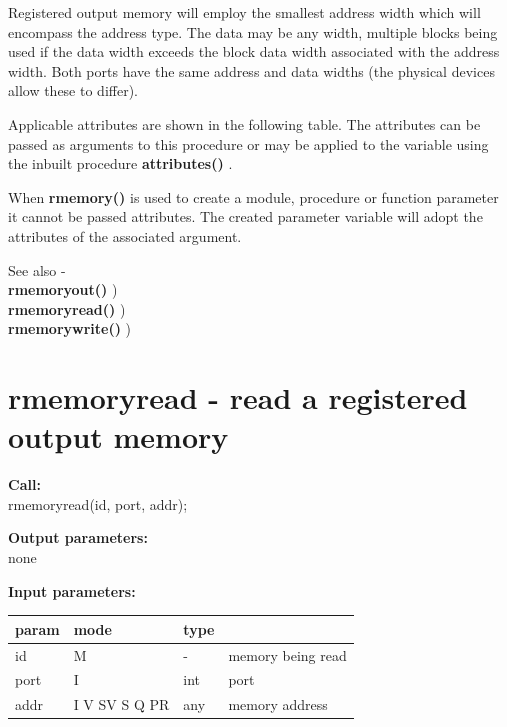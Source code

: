         Registered output memory will employ the smallest address width which
        will encompass the address type. The data may be any
        width, multiple blocks being used if the data width
        exceeds the block data width associated with the address width. Both
        ports have the same address and data widths (the physical devices allow
        these to differ).
        
        Applicable attributes are shown in the following table. The
        attributes can be passed as arguments to this procedure or may be
        applied to the variable using the inbuilt procedure
        {\bf attributes()} .
        
        When {\bf rmemory()} is used to create a module, procedure or function
        parameter it cannot be passed attributes. The created parameter variable
        will adopt the attributes of the associated argument.
        
        See also - \\
        {\bf rmemoryout()} ) \\
        {\bf rmemoryread()} ) \\
        {\bf rmemorywrite()} ) \\

    \section{rmemoryread - read a registered output memory}\label{sec:iprmemoryread}
        
        {\bf Call:} \\
        rmemoryread(id, port, addr);
        
        {\bf Output parameters:} \\
        none
        
        {\bf Input parameters:} \\
        \begin{tabular}{| l | l | l | l |}
        \hline
        param  & mode     & type  & \\
        \hline \hline
        id   & M             &  -  & memory being read  \\ \hline
        port & I             & int & port               \\ \hline
        addr & I V SV S Q PR & any & memory address     \\ \hline
        \end{tabular}
        
